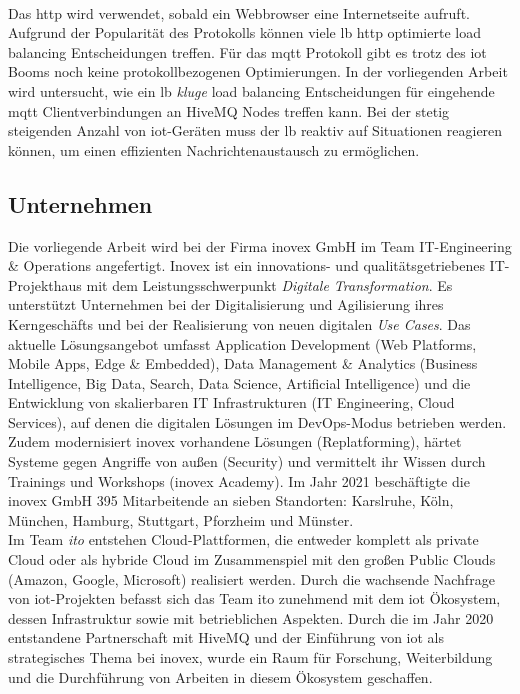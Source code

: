 \\
Das \ac{http} wird verwendet, sobald ein Webbrowser eine Internetseite aufruft. Aufgrund der Popularität des Protokolls können viele \acl{lb} \ac{http} optimierte load balancing Entscheidungen treffen.
Für das \ac{mqtt} Protokoll gibt es trotz des \ac{iot} Booms noch keine protokollbezogenen Optimierungen.
In der vorliegenden Arbeit wird untersucht, wie ein \acl{lb} \textit{kluge} load balancing Entscheidungen für eingehende \ac{mqtt} Clientverbindungen an HiveMQ Nodes treffen kann.
Bei der stetig steigenden Anzahl von \ac{iot}-Geräten muss der \acl{lb} reaktiv auf Situationen reagieren können, um einen effizienten Nachrichtenaustausch zu ermöglichen.
\begin{comment}
\\
Envoy ist ein Load Balancer, der dynamisch von einer Control Plane konfiguriert werden kann.
Zudem können anwendungsspezifische Netzwerkfilter programmiert und in die Pipeline eingebunden werden.
Diese Features ermöglichen eine individuelle Anpassung des Load Balancers an einen gegebenen Anwendungsfall.
Neben der Analyse von \ac{mqtt} load balancing Kriterien, werden sie ebenfalls in der vorliegenden Arbeit in einer Envoy Control Plane implementiert.
\end{comment}

\subsection{Unternehmen}
Die vorliegende Arbeit wird bei der Firma inovex GmbH im Team IT-Engineering \& Operations angefertigt.
Inovex ist ein innovations- und qualitätsgetriebenes IT-Projekthaus mit dem Leistungsschwerpunkt \textit{Digitale Transformation}.
Es unterstützt Unternehmen bei der Digitalisierung und Agilisierung ihres Kerngeschäfts und bei der Realisierung von neuen digitalen \textit{Use Cases}.
Das aktuelle Lösungsangebot umfasst Application Development (Web Platforms, Mobile Apps, Edge \& Embedded), Data Management \& Analytics (Business Intelligence, Big Data, Search, Data Science, Artificial Intelligence) und die Entwicklung von skalierbaren IT Infrastrukturen (IT Engineering, Cloud Services), auf denen die digitalen Lösungen im DevOps-Modus betrieben werden.
Zudem modernisiert inovex vorhandene Lösungen (Replatforming), härtet Systeme gegen Angriffe von au{\ss}en (Security) und vermittelt ihr Wissen durch Trainings und Workshops (inovex Academy).
Im Jahr 2021 beschäftigte die inovex GmbH 395 Mitarbeitende an sieben Standorten: Karslruhe, Köln, München, Hamburg, Stuttgart, Pforzheim und Münster.
\\
Im Team \textit{\ac{ito}} entstehen Cloud-Plattformen, die entweder komplett als private Cloud oder als hybride Cloud im Zusammenspiel mit den gro{\ss}en Public Clouds (Amazon, Google, Microsoft) realisiert werden.
Durch die wachsende Nachfrage von \acs{iot}-Projekten befasst sich das Team \ac{ito} zunehmend mit dem \acl{iot} Ökosystem, dessen Infrastruktur sowie mit betrieblichen Aspekten.
Durch die im Jahr 2020 entstandene Partnerschaft mit HiveMQ und der Einführung von \ac{iot} als strategisches Thema bei inovex, wurde ein Raum für Forschung, Weiterbildung und die Durchführung von Arbeiten in diesem Ökosystem geschaffen.

